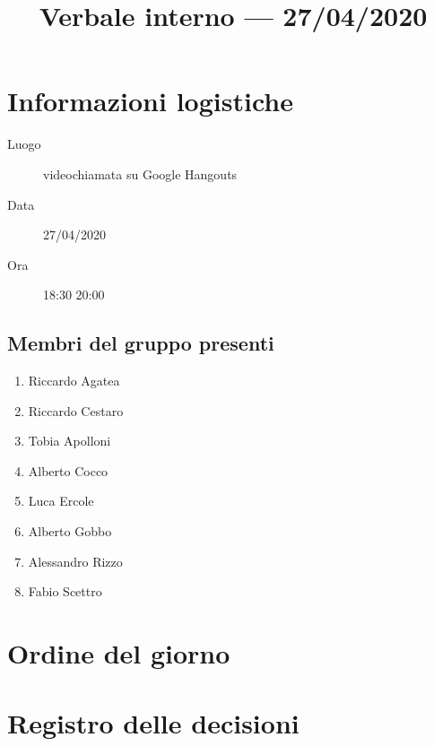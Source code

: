 \documentclass{article}
\title{Verbale interno --- 27/04/2020}
\begin{document}


\section{Informazioni logistiche}%
\label{sec:informazioni_logistiche}

\begin{description}
  \item [Luogo] videochiamata su Google Hangouts
  \item [Data] 27/04/2020
  \item [Ora] 18:30  20:00
\end{description}

\subsection{Membri del gruppo presenti}%
\label{sub:membri_del_gruppo_presenti}

\begin{enumerate}
  \item Riccardo Agatea
  \item Riccardo Cestaro
  \item Tobia Apolloni
  \item Alberto Cocco
  \item Luca Ercole
  \item Alberto Gobbo
  \item Alessandro Rizzo
  \item Fabio Scettro
\end{enumerate}

\section{Ordine del giorno}%
\label{sec:ordine_del_giorno}

\newpage
\section{Registro delle decisioni}%
\label{sec:registro_delle_decisioni}

\end{document}

